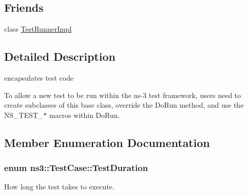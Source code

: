 \subsection*{Friends}
\begin{DoxyCompactItemize}
\item 
class \hyperlink{classns3_1_1TestCase_adebd005c0c7c24af2016237d7b6768f9}{Test\+Runner\+Impl}
\end{DoxyCompactItemize}


\subsection{Detailed Description}
encapsulates test code 

To allow a new test to be run within the ns-\/3 test framework, users need to create subclasses of this base class, override the Do\+Run method, and use the N\+S\+\_\+\+T\+E\+S\+T\+\_\+$\ast$ macros within Do\+Run. 

\subsection{Member Enumeration Documentation}
\subsubsection[{\texorpdfstring{Test\+Duration}{TestDuration}}]{\setlength{\rightskip}{0pt plus 5cm}enum {\bf ns3\+::\+Test\+Case\+::\+Test\+Duration}}\hypertarget{classns3_1_1TestCase_a11f6f57c21a0d32e605d192a89550f91}{}\label{classns3_1_1TestCase_a11f6f57c21a0d32e605d192a89550f91}


How long the test takes to execute. 


